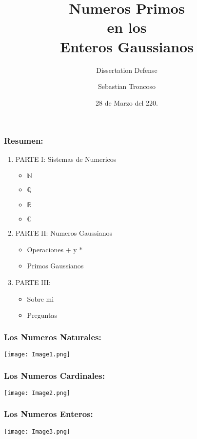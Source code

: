 \documentclass{beamer}
\title[Primos guassianos]{Numeros Primos\\ en los\\ Enteros Gaussianos}
\subtitle[Dissertation Defense]{Dissertation Defense}
\author[Sebastian Troncoso]{Sebastian Troncoso}
\institute[BSC]{Birmingham-Southern College}
\date[28 de Marzo]{ 28 de Marzo del 220. \\ \vspace{1cm} }
\def\CC{{\mathbb C}}
\def\NN{{\mathbb N}}
\def\QQ{{\mathbb Q}}
\def\RR{{\mathbb R}}
\theoremstyle{thmstyle}
\theoremstyle{thmstyle}
\theoremstyle{thmstyle}
\theoremstyle{mystyle}
\theoremstyle{qstnstyle}
\begin{document}
\begin{frame}
\titlepage
\end{frame}

\begin{frame}
\frametitle{Resumen:}

\begin{enumerate}
\item PARTE I: Sistemas de Numericos
\begin{itemize}
\item $\NN$
\item $\QQ$
\item $\RR$
\item $\CC$
\end{itemize}

\pause
\item PARTE II: Numeros Gaussianos
\begin{itemize}
\item Operaciones $+$ y $*$
\item Primos Gaussianos
\end{itemize}

\pause
\item PARTE III: 
\begin{itemize}
\item Sobre mi

\item Preguntas
\end{itemize}
\end{enumerate}
\end{frame}

\begin{frame}
\frametitle{Los Numeros Naturales:}
\begin{center}
\texttt{[image: Image1.png]}
\end{center}
\end{frame}

\begin{frame}
\frametitle{Los Numeros Cardinales:}
\begin{center}
\texttt{[image: Image2.png]}
\end{center}
\end{frame}

\begin{frame}
\frametitle{Los Numeros Enteros:}
\begin{center}
\texttt{[image: Image3.png]}
\end{center}
\end{frame}
\end{document}
